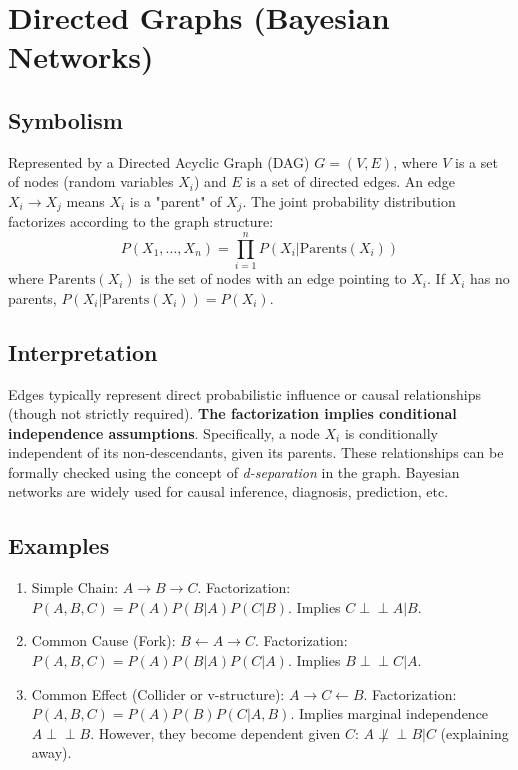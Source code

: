 \documentclass{article}
\newcommand{\Indep}{\perp \!\!\! \perp} %
\begin{document}
\section{Directed Graphs (Bayesian Networks)}

\subsection*{Symbolism}
Represented by a Directed Acyclic Graph (DAG) $G = (V, E)$, where $V$ is a set of nodes (random variables $X_i$) and $E$ is a set of directed edges. An edge $X_i \to X_j$ means $X_i$ is a "parent" of $X_j$. The joint probability distribution factorizes according to the graph structure:
\[ P(X_1, \dots, X_n) = \prod_{i=1}^n P(X_i | \text{Parents}(X_i)) \]
where $\text{Parents}(X_i)$ is the set of nodes with an edge pointing to $X_i$. If $X_i$ has no parents, $P(X_i | \text{Parents}(X_i)) = P(X_i)$.

\subsection*{Interpretation}
Edges typically represent direct probabilistic influence or causal relationships (though not strictly required). \textbf{The factorization implies conditional independence assumptions}. Specifically, a node $X_i$ is conditionally independent of its non-descendants, given its parents. These relationships can be formally checked using the concept of \emph{d-separation} in the graph. Bayesian networks are widely used for causal inference, diagnosis, prediction, etc.

\subsection*{Examples}
\begin{enumerate}
    \item Simple Chain: $A \to B \to C$.
    Factorization: $P(A, B, C) = P(A) P(B|A) P(C|B)$.
    Implies $C \Indep A | B$.
    \item Common Cause (Fork): $B \leftarrow A \to C$.
    Factorization: $P(A, B, C) = P(A) P(B|A) P(C|A)$.
    Implies $B \Indep C | A$.
    \item Common Effect (Collider or v-structure): $A \to C \leftarrow B$.
    Factorization: $P(A, B, C) = P(A) P(B) P(C|A, B)$.
    Implies marginal independence $A \Indep B$. However, they become dependent given $C$: $A \not\Indep B | C$ (explaining away).
\end{enumerate}
\end{document}
